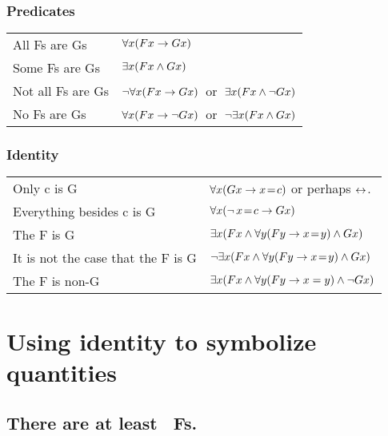 \subsubsection*{Predicates}
\begin{center}
\begin{tabular*}{\textwidth}{ll}\label{SymbolizingPredicates}
All Fs are Gs & $\forall x(Fx \rightarrow Gx)$\\
Some Fs are Gs & $\exists x(Fx \wedge Gx)$\\
Not all Fs are Gs & $\neg\forall x(Fx \rightarrow Gx)$\ or\ $\exists x(Fx \wedge \neg Gx)$\\
No Fs are Gs & $\forall x(Fx \rightarrow\neg Gx)$\ or\ $\neg\exists x(Fx \wedge Gx)$\\
\end{tabular*}
\end{center}
\subsubsection*{Identity}
\begin{center}
\begin{tabular*}{\textwidth}{ll}
Only c is G & $\forall x(Gx \rightarrow x\!=\! c)$ or perhaps $\leftrightarrow$.  \\
Everything besides c is G & $\forall x(\neg \,x \!=\!  c \rightarrow Gx)$\\
The F is G & $\exists x(Fx \wedge \forall y(Fy \rightarrow x\!=\! y) \wedge Gx)$\\
It is not the case that the F is G & $\neg\exists x(Fx \wedge \forall y(Fy \rightarrow x\!=\! y) \wedge Gx)$\\
The F is non-G & $\exists x(Fx \wedge \forall y(Fy \rightarrow x=y) \wedge \neg Gx)$
\end{tabular*}
\end{center}







\newpage
\section{Using identity to symbolize quantities}

\subsection*{There are at least \blank\ Fs.}
\label{summary.atleast}

